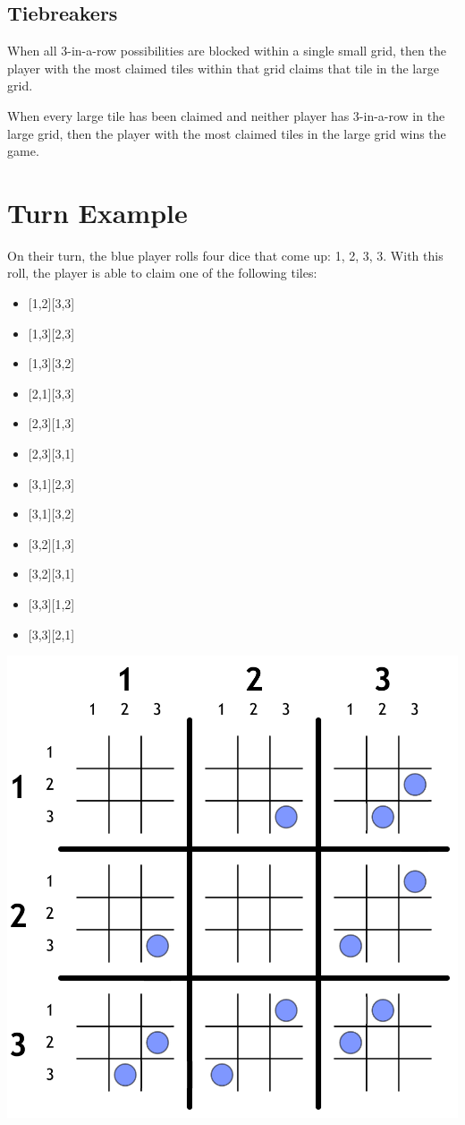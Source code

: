 \documentclass{article}
\begin{document}
\subsection{Tiebreakers}
When all 3-in-a-row possibilities are blocked within a single small grid, then the player with the most claimed tiles within that grid claims that tile in the large grid.

When every large tile has been claimed and neither player has 3-in-a-row in the large grid, then the player with the most claimed tiles in the large grid wins the game.

\section{Turn Example}
On their turn, the blue player rolls four dice that come up: 1, 2, 3, 3. With this roll, the player is able to claim one of the following tiles:

\begin{multicols}{3}
\begin{itemize}
\item {[}1,2][3,3]
\item {[}1,3][2,3]
\item {[}1,3][3,2]
\item {[}2,1][3,3]
\item {[}2,3][1,3]
\item {[}2,3][3,1]
\item {[}3,1][2,3]
\item {[}3,1][3,2]
\item {[}3,2][1,3]
\item {[}3,2][3,1]
\item {[}3,3][1,2]
\item {[}3,3][2,1]
\end{itemize}
\end{multicols}

\begin{center}
\includegraphics[width=0.8\linewidth]{diagram2}
\end{center}
\end{document}
